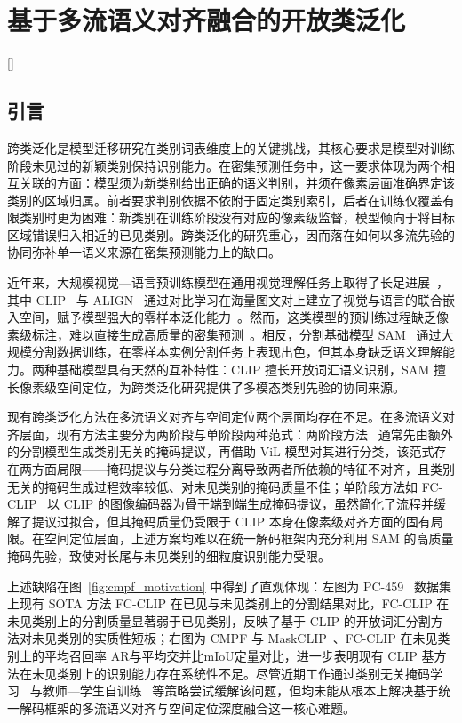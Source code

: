 
\chapter[基于多流语义对齐融合的开放类泛化]{基于多流语义对齐融合的开放类泛化}[]

\label{chap:4}
\thispagestyle{plain}
\section{引言}

跨类泛化是模型迁移研究在类别词表维度上的关键挑战，其核心要求是模型对训练阶段未见过的新颖类别保持识别能力。在密集预测任务中，这一要求体现为两个相互关联的方面：模型须为新类别给出正确的语义判别，并须在像素层面准确界定该类别的区域归属。前者要求判别依据不依附于固定类别索引，后者在训练仅覆盖有限类别时更为困难：新类别在训练阶段没有对应的像素级监督，模型倾向于将目标区域错误归入相近的已见类别。跨类泛化的研究重心，因而落在如何以多流先验的协同弥补单一语义来源在密集预测能力上的缺口。

近年来，大规模视觉—语言预训练模型在通用视觉理解任务上取得了长足进展~\cite{yin2023vlp}，其中 CLIP~\cite{radford2021learning} 与 ALIGN~\cite{jia2021scaling} 通过对比学习在海量图文对上建立了视觉与语言的联合嵌入空间，赋予模型强大的零样本泛化能力~\cite{radford2021learning,zhou2022learning}。然而，这类模型的预训练过程缺乏像素级标注，难以直接生成高质量的密集预测~\cite{rao2022denseclip}。相反，分割基础模型 SAM~\cite{kirillov2023segment} 通过大规模分割数据训练，在零样本实例分割任务上表现出色，但其本身缺乏语义理解能力。两种基础模型具有天然的互补特性：CLIP 擅长开放词汇语义识别，SAM 擅长像素级空间定位，为跨类泛化研究提供了多模态类别先验的协同来源。

现有跨类泛化方法在多流语义对齐与空间定位两个层面均存在不足。在多流语义对齐层面，现有方法主要分为两阶段与单阶段两种范式：两阶段方法~\cite{liang2023open,ding2022decoupling,xu2022simple} 通常先由额外的分割模型生成类别无关的掩码提议，再借助 ViL 模型对其进行分类，该范式存在两方面局限——掩码提议与分类过程分离导致两者所依赖的特征不对齐，且类别无关的掩码生成过程效率较低、对未见类别的掩码质量不佳；单阶段方法如 FC-CLIP~\cite{yu2023convolutions} 以 CLIP 的图像编码器为骨干端到端生成掩码提议，虽然简化了流程并缓解了提议过拟合，但其掩码质量仍受限于 CLIP 本身在像素级对齐方面的固有局限。在空间定位层面，上述方案均难以在统一解码框架内充分利用 SAM 的高质量掩码先验，致使对长尾与未见类别的细粒度识别能力受限。

上述缺陷在图~\ref{fig:cmpf_motivation} 中得到了直观体现：左图为 PC-459~\cite{mottaghi2014role} 数据集上现有 SOTA 方法 FC-CLIP 在已见与未见类别上的分割结果对比，FC-CLIP 在未见类别上的分割质量显著弱于已见类别，反映了基于 CLIP 的开放词汇分割方法对未见类别的实质性短板；右图为 CMPF 与 MaskCLIP~\cite{ding2023open}、FC-CLIP 在未见类别上的平均召回率 AR与平均交并比mIoU定量对比，进一步表明现有 CLIP 基方法在未见类别上的识别能力存在系统性不足。尽管近期工作通过类别无关掩码学习~\cite{liang2023open,dou2022learning} 与教师—学生自训练~\cite{xu2023learning} 等策略尝试缓解该问题，但均未能从根本上解决基于统一解码框架的多流语义对齐与空间定位深度融合这一核心难题。

